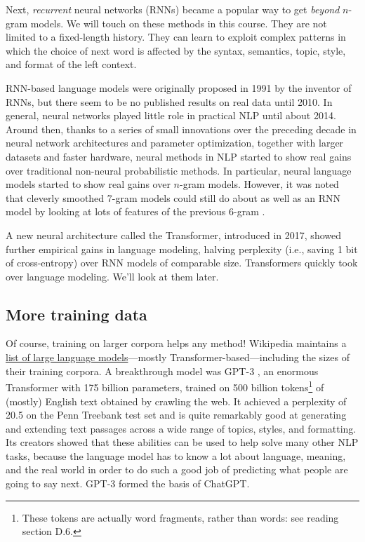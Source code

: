 \documentclass[12pt]{article}
\theoremstyle{plain}
\theoremstyle{definition}
\theoremstyle{remark}
\begin{document}
Next, \textit{recurrent} neural networks (RNNs) became a popular way to get \textit{beyond} $n$-gram models. We will touch on these methods in this course. They are not limited to a fixed-length history. They can learn to exploit complex patterns in which the choice of next word is affected by the syntax, semantics, topic, style, and format of the left context.

RNN-based language models were originally proposed in 1991 by the inventor of RNNs, but there seem to be no published results on real data until 2010. In general, neural networks played little role in practical NLP until about 2014. Around then, thanks to a series of small innovations over the preceding decade in neural network architectures and parameter optimization, together with larger datasets and faster hardware, neural methods in NLP started to show real gains over traditional non-neural probabilistic methods. In particular, neural language models started to show real gains over $n$-gram models. However, it was noted that cleverly smoothed 7-gram models could still do about as well as an RNN model by looking at lots of features of the previous 6-gram \cite{Peleman2016}.

A new neural architecture called the Transformer, introduced in 2017, showed further empirical gains in language modeling, halving perplexity (i.e., saving 1 bit of cross-entropy) over RNN models of comparable size. Transformers quickly took over language modeling. We’ll look at them later.

\subsection*{More training data}
Of course, training on larger corpora helps any method! Wikipedia maintains a \href{https://en.wikipedia.org/wiki/List_of_large_language_models}{list of large language models}—mostly Transformer-based—including the sizes of their training corpora. A breakthrough model was GPT-3 \cite{Brown2020}, an enormous Transformer with 175 billion parameters, trained on 500 billion tokens\footnote{These tokens are actually word fragments, rather than words: see reading section D.6.} of (mostly) English text obtained by crawling the web. It achieved a perplexity of 20.5 on the Penn Treebank test set and is quite remarkably good at generating and extending text passages across a wide range of topics, styles, and formatting. Its creators showed that these abilities can be used to help solve many other NLP tasks, because the language model has to know a lot about language, meaning, and the real world in order to do such a good job of predicting what people are going to say next. GPT-3 formed the basis of ChatGPT.
\end{document}
